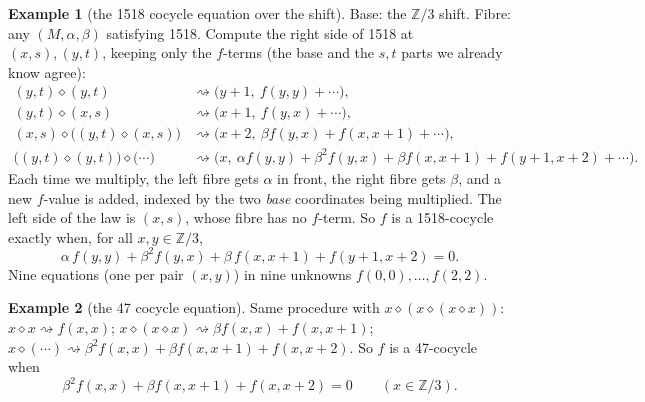 \documentclass[11pt]{article}
\theoremstyle{definition}\newtheorem{example}{Example}\newtheorem{exercise}{Exercise}
\theoremstyle{remark}\newtheorem*{remark}{Remark}
\newcommand{\op}{\diamond}
\newcommand{\Z}{\mathbb{Z}}
\begin{document}
\begin{example}[the 1518 cocycle equation over the shift]\label{ex:cocycle}
Base: the $\Z/3$ shift. Fibre: any $(M,\alpha,\beta)$ satisfying 1518. Compute the right side of 1518 at $(x,s),(y,t)$, keeping only the $f$-terms (the base and the $s,t$ parts we already know agree):
\begin{align*}
(y,t)\op(y,t) &\rightsquigarrow \bigl(y+1,\ f(y,y)+\cdots\bigr),\\
(y,t)\op(x,s) &\rightsquigarrow \bigl(x+1,\ f(y,x)+\cdots\bigr),\\
(x,s)\op\bigl((y,t)\op(x,s)\bigr) &\rightsquigarrow \bigl(x+2,\ \beta f(y,x)+f(x,x+1)+\cdots\bigr),\\
\bigl((y,t)\op(y,t)\bigr)\op\bigl(\cdots\bigr) &\rightsquigarrow \bigl(x,\ \alpha f(y,y)+\beta^2 f(y,x)+\beta f(x,x+1)+f(y+1,x+2)+\cdots\bigr).
\end{align*}
Each time we multiply, the left fibre gets $\alpha$ in front, the right fibre gets $\beta$, and a new $f$-value is added, indexed by the two \emph{base} coordinates being multiplied. The left side of the law is $(x,s)$, whose fibre has no $f$-term. So $f$ is a 1518-cocycle exactly when, for all $x,y\in\Z/3$,
\begin{equation}\label{eq:c1518}
\alpha\, f(y,y) + \beta^2 f(y,x) + \beta\, f(x,x+1) + f(y+1,x+2) = 0 .
\end{equation}
Nine equations (one per pair $(x,y)$) in nine unknowns $f(0,0),\dots,f(2,2)$.
\end{example}

\begin{example}[the 47 cocycle equation]
Same procedure with $x\op(x\op(x\op x))$: $x\op x\rightsquigarrow f(x,x)$; $x\op(x\op x)\rightsquigarrow \beta f(x,x)+f(x,x+1)$; $x\op(\cdots)\rightsquigarrow \beta^2 f(x,x)+\beta f(x,x+1)+f(x,x+2)$. So $f$ is a 47-cocycle when
\begin{equation}\label{eq:c47}
\beta^2 f(x,x)+\beta f(x,x+1)+f(x,x+2)=0 \qquad (x\in\Z/3).
\end{equation}
\end{example}
\end{document}
